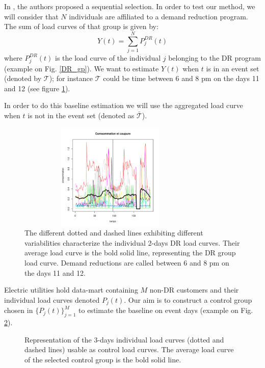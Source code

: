 \documentclass[journal]{IEEEtran}
\begin{document}
In \cite{directestimation}, the authors proposed a sequential
selection.  In order to test our method, we will consider that $N$
individuals are affiliated to a demand reduction program. The sum of
load curves of that group is given by:
\begin{equation}\label{eq:DRcurve}
Y(t)=\sum_{j=1}^N P_j^{DR}(t)
\end{equation}
where $P_j^{DR}(t)$ is the load curve of the individual $j$ belonging
to the DR program (example on Fig. \ref{DR_gp}). We want to estimate
$Y(t)$ when $t$ is in an event set (denoted by $\mathcal{T}$); for instance $\mathcal{T}$ could be time
between 6 and 8 pm on the days 11 and 12 (see figure \ref{DR_gpe2}).

In order to do this baseline estimation we will use the aggregated
load curve when $t$ is not in the  event set (denoted as
$\bar{\mathcal{T}}$).
\begin{figure}[!h]
  \centering \includegraphics[width=3.5in,height=2in]{DR_gp}
\caption{{\scriptsize The different dotted and dashed lines exhibiting
    different variabilities characterize the individual 2-days DR load
    curves. Their average load curve is the bold solid line,
    representing the DR group load curve. Demand reductions are called
    between 6 and 8 pm on the days 11 and 12.}}
\label{DR_gpe2}
\end{figure}
Electric utilities hold data-mart containing $M$ non-DR customers and
their individual load curves denoted $P_j(t)$. Our aim is to
construct a control group chosen in $\{P_j(t)\}_{j=1}^M$ to
estimate the baseline on event days (example on Fig. \ref{CG_gpe2}).
\begin{figure}[!h]
\centering
\caption{{\scriptsize Representation of the 3-days individual load
    curves (dotted and dashed lines) usable as control load
    curves. The average load curve of the selected control group is
    the bold solid line.}}
\label{CG_gpe2}
\end{figure}
\end{document}
